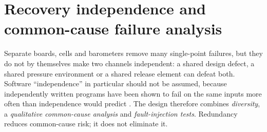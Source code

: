 \section{Recovery independence and common-cause failure analysis}
\label{sec:ccf}
Separate boards, cells and barometers remove many single-point failures, but they do not by themselves make two channels independent: a shared design defect, a shared pressure environment or a shared release element can defeat both. Software ``independence'' in particular should not be assumed, because independently written programs have been shown to fail on the same inputs more often than independence would predict \cite{knight1986}. The design therefore combines \emph{diversity}, a \emph{qualitative common-cause analysis} and \emph{fault-injection tests}. Redundancy reduces common-cause risk; it does not eliminate it.

